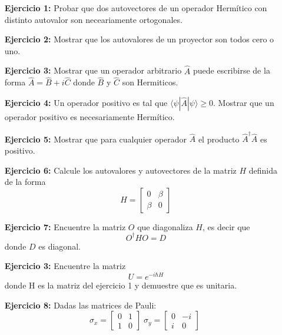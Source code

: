 \documentclass[a4paper,12pt]{article}
\newcommand{\bra}[1]{\langle #1 |}
\newcommand{\ket}[1]{| #1 \rangle}
\begin{document}
\begin{enumerate}
    \item[\bf Ejercicio 1:] Probar que dos autovectores de un operador Hermítico con distinto autovalor son neceariamente ortogonales.
    \item[\bf Ejercicio 2:] Mostrar que los autovalores de un proyector son todos cero o uno.
    \item[\bf Ejercicio 3:] Mostrar que un operador arbitrario $\hat{A}$ puede escribirse de la forma $\hat{A}=\hat{B}+i\hat{C}$ donde $\hat{B}$ y $\hat{C}$ son Hermiticos. 
    \item[\bf Ejercicio 4:] Un operador positivo es tal que $\bra{\psi}\hat{A}\ket{\psi}\geq 0$. Mostrar que un operador positivo es necesariamente Hermítico.
    \item[\bf Ejercicio 5:] Mostrar que para cualquier operador $\hat{A}$ el producto $\hat{A}^\dagger\hat{A}$ es positivo.
    \item[\bf Ejercicio 6:] Calcule los autovalores y autovectores de la matriz $H$ definida
    de la forma
    \begin{equation}
        H = \begin{bmatrix}
            0 & \beta \\
            \beta & 0 
            \end{bmatrix}
    \end{equation}
    \item[\bf Ejercicio 7:] Encuentre la matriz $O$ que diagonaliza $H$, es decir que
    \begin{equation}
        O^\dagger H O = D
    \end{equation}
    donde $D$ es diagonal.
    \item[\bf Ejercicio 3:] Encuentre la matriz 
    \begin{equation}
        U = e^{-i\hbar H}
    \end{equation}
    donde H es la matriz del ejercicio 1 y demuestre que es unitaria.
    \item[\bf Ejercicio 8:] Dadas las matrices de Pauli:
    \begin{equation}
        \sigma_x = \begin{bmatrix}
            0 & 1 \\
            1 & 0 
            \end{bmatrix}\;
        \sigma_y = \begin{bmatrix}
            0 & -i \\
            i & 0 
            \end{bmatrix}\;

\end{equation}
\end{enumerate}
\end{document}
